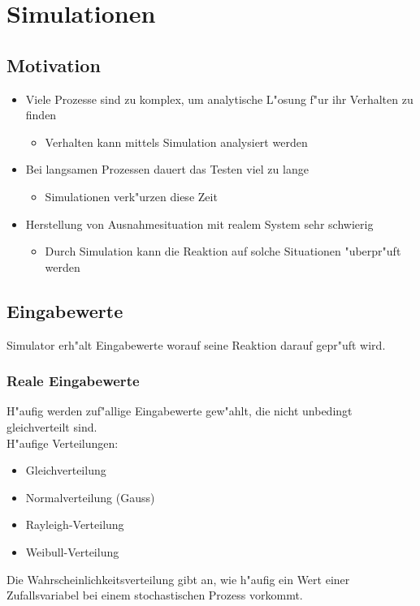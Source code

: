 \section{Simulationen}
\subsection{Motivation}
\begin{itemize}
\item Viele Prozesse sind zu komplex, um analytische L"osung f"ur ihr Verhalten zu finden
	\begin{itemize}
	\item Verhalten kann mittels Simulation analysiert werden
	\end{itemize}
\item Bei langsamen Prozessen dauert das Testen viel zu lange
	\begin{itemize}
	\item Simulationen verk"urzen diese Zeit
	\end{itemize}
\item Herstellung von Ausnahmesituation mit realem System sehr schwierig
	\begin{itemize}
	\item Durch Simulation kann die Reaktion auf solche Situationen "uberpr"uft werden
	\end{itemize}
\end{itemize}

\subsection{Eingabewerte}
Simulator erh"alt Eingabewerte worauf seine Reaktion darauf gepr"uft wird. 
\subsubsection{Reale Eingabewerte}
H"aufig werden zuf"allige Eingabewerte gew"ahlt, die nicht unbedingt gleichverteilt sind.\\
H"aufige Verteilungen:\\
\begin{itemize}
\item Gleichverteilung
\item Normalverteilung (Gauss)
\item Rayleigh-Verteilung
\item Weibull-Verteilung
\end{itemize}
Die Wahrscheinlichkeitsverteilung gibt an, wie h"aufig ein Wert einer Zufallsvariabel bei einem stochastischen Prozess vorkommt. 

